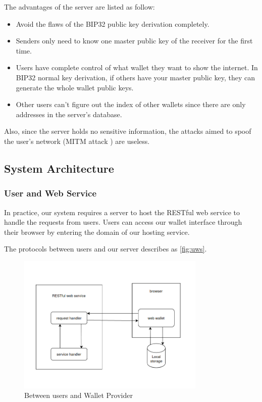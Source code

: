 The advantages of the server are listed as follow:

\begin{itemize}
    \item Avoid the flaws of the BIP32 public key derivation completely.
    \item Senders only need to know one master public key of the receiver for the first time.
    \item Users have complete control of what wallet they want to show the internet. In BIP32 normal key derivation, if others have your master public key, they can generate the whole wallet public keys.
    \item Other users can't figure out the index of other wallets since there are only addresses in the server's database.
\end{itemize}

Also, since the server holds no sensitive information, the attacks aimed to spoof the user’s network (MITM attack \cite{mitm}) are useless.



\subsection{System Architecture}
\label{system_architect}

\subsubsection{User and Web Service}

In practice, our system requires a server to host the RESTful web service to handle the requests from users. Users can access our wallet interface through their browser by entering the domain of our hosting service.

The protocols between users and our server describes as \autoref{fig:uws}.

\begin{figure}[!ht]
    \centering
    \includegraphics[width=0.8\textwidth]{images/design_uws.png}
    \caption[Between users and Wallet Provider]{Between users and Wallet Provider}
    \label{fig:uws}
\end{figure}

